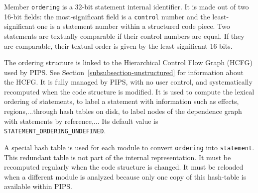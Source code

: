 \documentclass[a4paper]{article}
\begin{document}
Member \texttt{ordering} is a 32-bit statement internal identifier. It is
made out of two 16-bit fields: the most-significant field is a 
\texttt{control} number and the least-significant one is a statement number
within a structured code piece. Two statements are textually comparable
if their control numbers are equal. If they are comparable, their
textual order is given by the least significant 16 bits.

The ordering structure is linked to the Hierarchical Control Flow Graph
(HCFG) used by PIPS. See Section~\ref{subsubsection-unstructured} for
information about the HCFG. It is fully managed by PIPS, with no user
control, and systematically recomputed when the code structure is
modified. It is used to compute the lexical ordering of statements, to
label a statement with information such as effects, regions,...through
hash tables on disk, to label nodes of the dependence graph with
statements by reference,... Its default value is
\verb+STATEMENT_ORDERING_UNDEFINED+.

A special hash table is used for each module to convert \verb/ordering/
into \verb/statement/. This redundant table is not part of the internal
representation. It must be recomputed regularly when the code structure
is changed. It must be reloaded when a different module is analyzed
because only one copy of this hash-table is available within PIPS.

\begin{comment}
Le sous-domaine \verb/ordering/ contient un entier caract�ristique du
statement; il est form� de la concat�nation du num�ro de composante
dans le graphe de contr�le (num�ro du control) et du num�ro de
statement dans dans cette composante; cet entier sert � comparer
l'ordre lexical des statements et sa valeur par defaut est
\verb+STATEMENT_ORDERING_UNDEFINED+. Il est automatiquement recalcul�
apr�s chaque transformation de programme. 

Il est aussi utilis� comme nom absolu d'un \verb/statement/ quand des
structures de donn�es comme les tables de hash-code sont �crites sur
disque ou relues. Il est aussi utilis� pour �tabli un lien entre les
noeuds du graphe de d�pendance et les statements. Il est possible de
cr�er une table de correspondance entre \verb/ordering/ et
\verb/statement/, mais elle ne fait pas partie de la repr�sentation
interne et doit cond �tre calcul�e explicitement.
\end{comment}
\end{document}
